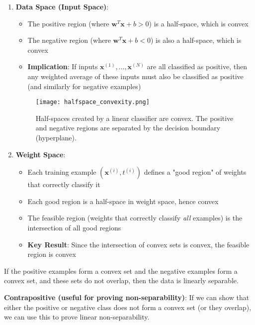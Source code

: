 \begin{enumerate}
    \item \textbf{Data Space (Input Space)}:
    \begin{itemize}
        \item The positive region (where \(\mathbf{w}^T\mathbf{x} + b > 0\)) is a half-space, which is convex
        \item The negative region (where \(\mathbf{w}^T\mathbf{x} + b < 0\)) is also a half-space, which is convex
        \item \textbf{Implication}: If inputs \(\mathbf{x}^{(1)}, \ldots, \mathbf{x}^{(N)}\) are all classified as positive, then any weighted average of these inputs must also be classified as positive (and similarly for negative examples)
    \end{itemize}

    \begin{figure}[H]
        \centering
        \texttt{[image: halfspace\_convexity.png]}
        \caption{Half-spaces created by a linear classifier are convex. The positive and negative regions are separated by the decision boundary (hyperplane).}
        \label{fig:halfspace_convexity}
    \end{figure}

    \item \textbf{Weight Space}:
    \begin{itemize}
        \item Each training example \((\mathbf{x}^{(i)}, t^{(i)})\) defines a "good region" of weights that correctly classify it
        \item Each good region is a half-space in weight space, hence convex
        \item The feasible region (weights that correctly classify \textit{all} examples) is the intersection of all good regions
        \item \textbf{Key Result}: Since the intersection of convex sets is convex, the feasible region is convex
    \end{itemize}
\end{enumerate}

\begin{theorem}
If the positive examples form a convex set and the negative examples form a convex set, and these sets do not overlap, then the data is linearly separable.
\end{theorem}

\textbf{Contrapositive (useful for proving non-separability)}: If we can show that either the positive or negative class does not form a convex set (or they overlap), we can use this to prove linear non-separability.

